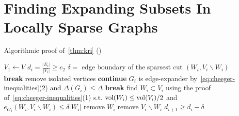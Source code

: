 \section{Finding Expanding Subsets In Locally Sparse Graphs}

\begin{algorithm}
    \caption{Algorithmic proof of~\autoref{thm:kri} (\cite{kri17})}
    \label{alg:kri}
    \begin{algorithmic}
        \State $V_1\gets V$
            \State $d_i=\frac{|E_i|}{|V_i|}\geq c_2$
            \State $\delta=$ edge boundary of the sparsest cut $(W_i, V_i\backslash W_i)$
                \State \textbf{break}
                \State remove isolated vertices
                \State \textbf{continue}
                \State $G_i$ is edge-expander by~\eqref{eq:cheeger-inequalities}(2)
                \State and $\Delta(G_i)\leq\Delta$
                \State \textbf{break}
            \Else
                \State find $W_i\subset V_i$ using the proof of~\eqref{eq:cheeger-inequalities}(1)
                \State s.t. $\operatorname*{vol}(W_i)\leq\operatorname*{vol}(V_i)/2$
                \State and $e_{G_i}(W_i,V_i\backslash W_i)\leq \delta|W_i|$
                    \State remove $W_i$
                \Else{}
                    \State remove $V_i\backslash W_i$
                    \State $d_{i+1}\geq d_i-\delta$
                \EndIf
            \EndIf
        \EndFor
        \EndProcedure
    \end{algorithmic}
\end{algorithm}
